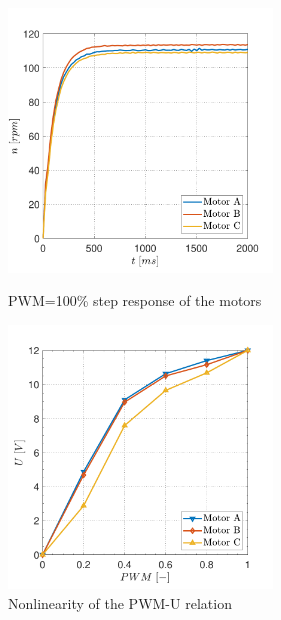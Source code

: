 \documentclass[12pt,english]{article}
\begin{document}
\begin{figure}[htb!]
	\centering
	\centering
	\includegraphics[height=7cm]{figures/directed_speed_pwm_100}
	\caption{PWM=100\% step response of the motors}
	\label{directed_speed_pwm_100}
	\endminipage\hfill
	\centering
	\includegraphics[height=7cm]{figures/pwm_u}
	\caption{Nonlinearity of the PWM-U relation}
	\label{pwm_characteristic}
	\endminipage\hfill
\end{figure}
\end{document}

